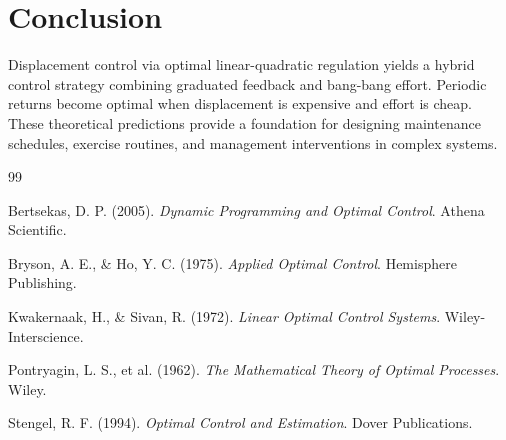 \documentclass[12pt]{article}
\begin{document}
\section{Conclusion}

Displacement control via optimal linear-quadratic regulation yields a hybrid control strategy combining graduated feedback and bang-bang effort. Periodic returns become optimal when displacement is expensive and effort is cheap. These theoretical predictions provide a foundation for designing maintenance schedules, exercise routines, and management interventions in complex systems.

\begin{thebibliography}{99}

 Bertsekas, D. P. (2005). \textit{Dynamic Programming and Optimal Control}. Athena Scientific.

 Bryson, A. E., \& Ho, Y. C. (1975). \textit{Applied Optimal Control}. Hemisphere Publishing.

 Kwakernaak, H., \& Sivan, R. (1972). \textit{Linear Optimal Control Systems}. Wiley-Interscience.

 Pontryagin, L. S., et al. (1962). \textit{The Mathematical Theory of Optimal Processes}. Wiley.

 Stengel, R. F. (1994). \textit{Optimal Control and Estimation}. Dover Publications.

\end{thebibliography}
\end{document}
